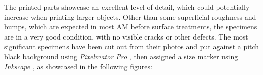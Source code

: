 \documentclass{article}
\begin{document}
    \begin{table}[h!]
        \centering
    \caption{A list of the most relevant 3D printed specimens}
    \label{tab:SLS_samples}
    \end{table}

        The printed parts showcase an excellent level of detail, which could potentially increase when printing larger objects. 
        Other than some superficial roughness and bumps, which are expected
        in most AM before surface treatments, the specimens are in a very good condition, with no visible cracks or other defects.
        The most significant specimens have been cut out from their photos and put against a pitch black background
        using \textit{Pixelmator Pro} \autocites{Pixelmator_Pro}, then assigned a size marker using \textit{Inkscape}
        \autocites{Inkscape}, as showcased in the following figures: 
\end{document}
